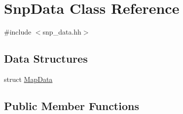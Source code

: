 \hypertarget{classSnpData}{
\section{SnpData Class Reference}
\label{classSnpData}
}


{\ttfamily \#include $<$snp\_\-data.hh$>$}

\subsection*{Data Structures}
\begin{DoxyCompactItemize}
\item 
struct \hyperlink{structSnpData_1_1MapData}{MapData}
\end{DoxyCompactItemize}
\subsection*{Public Member Functions}
